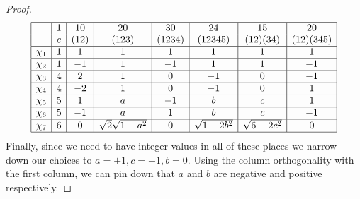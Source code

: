\documentclass[11pt]{article}
\begin{document}
\begin{proof}
\[
\begin{array}{|c|c|c|c|c|c|c|c|}
\hline
&1&10&20&30&24&15&20\\
&e&(12)&(123)&(1234)&(12345)&(12)(34)&(12)(345)\\
\hline
\chi_1&1&1&1&1&1&1&1\\
\hline
\chi_2&1&-1&1&-1&1&1&-1\\
\hline
\chi_3&4&2&1&0&-1&0&-1\\
\hline
\chi_4&4&-2&1&0&-1&0&1\\
\hline
\chi_5&5&1&a&-1&b&c&1\\
\hline
\chi_6&5&-1&a&1&b&c&-1\\
\hline
\chi_7&6&0&\sqrt{2}\sqrt{1-a^2}&0&\sqrt{1-2b^2}&\sqrt{6-2c^2}&0\\
\hline
\end{array}\]
Finally, since we need to have integer values in all of these places we narrow down our choices to $a= \pm 1, c = \pm 1, b = 0$. Using the column orthogonality with the first column, we can pin down that $a$ and $b$ are negative and positive respectively.
\end{proof}
\end{document}
